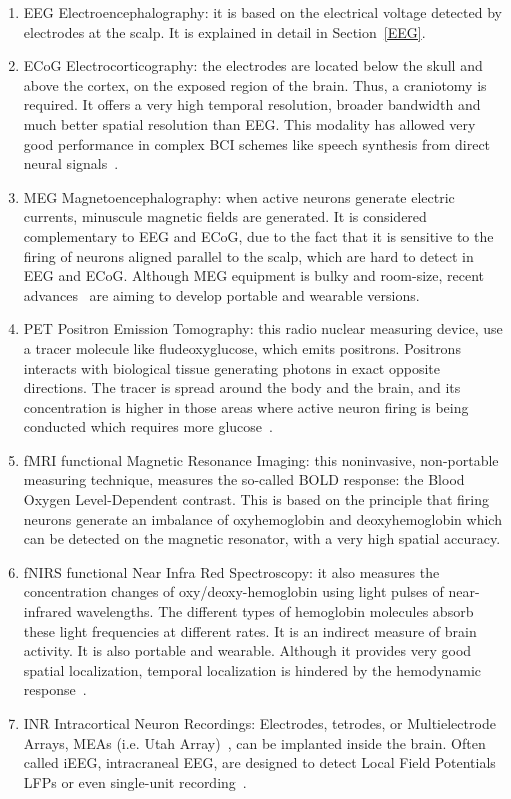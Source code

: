 \begin{enumerate}
\item EEG Electroencephalography: it is based on the electrical voltage detected by electrodes at the scalp.  It is explained in detail in Section~\ref{EEG}.
\item ECoG Electrocorticography: the electrodes are located below the skull and above the cortex, on the exposed region of the brain. Thus, a craniotomy is required.  It offers a very high temporal resolution, broader bandwidth and much better spatial resolution than EEG.  This modality has allowed very good performance in complex BCI schemes like speech synthesis from direct neural signals~\cite{Herff2016}.
\item MEG Magnetoencephalography: when active neurons generate electric currents, minuscule magnetic fields are generated.  It is considered complementary to EEG and ECoG, due to the fact that it is sensitive to the firing of neurons aligned parallel to the scalp, which are hard to detect in EEG and ECoG.   Although MEG equipment is bulky and room-size, recent advances~\cite{Boto2018} are aiming to develop portable and wearable versions. 
\item PET Positron Emission Tomography: this radio nuclear measuring device, use a tracer molecule like fludeoxyglucose, which emits positrons.  Positrons interacts with biological tissue generating photons in exact opposite directions.  The tracer is spread around the body and the brain, and its concentration is higher in those areas where active neuron firing is being conducted which requires more glucose~\cite{Nam2010}. 
\item fMRI  functional Magnetic Resonance Imaging: this noninvasive, non-portable measuring technique, measures the so-called BOLD response: the Blood Oxygen Level-Dependent contrast.  This is based on the principle that firing neurons generate an imbalance of oxyhemoglobin and deoxyhemoglobin which can be detected on the magnetic resonator, with a very high spatial accuracy.
\item fNIRS  functional Near Infra Red Spectroscopy:  it also measures the concentration changes of oxy/deoxy-hemoglobin using light pulses of near-infrared wavelengths.  The different types of hemoglobin molecules absorb these light frequencies at different rates.  It is an indirect measure of brain activity.  It is also portable and wearable.  Although it provides very good spatial localization, temporal localization is hindered by the hemodynamic response~\cite{Nam2010}.
\item INR Intracortical Neuron Recordings: Electrodes, tetrodes, or Multielectrode Arrays, MEAs (i.e. Utah Array)~\cite{Ajiboye2017}, can be implanted inside the brain.  Often called iEEG, intracraneal EEG, are designed to detect Local Field Potentials LFPs or even single-unit recording~\cite{Buzsaki2012}.
\end{enumerate}


